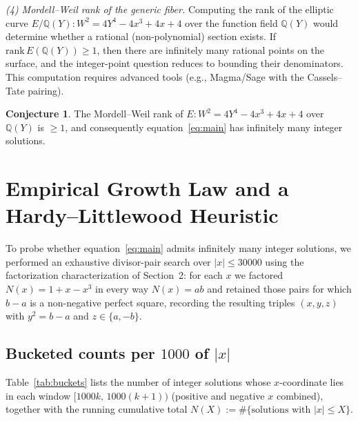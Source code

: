 \documentclass[12pt,a4paper]{article}
\theoremstyle{definition}
\newtheorem{conjecture}[theorem]{Conjecture}
\newcommand{\Q}{\mathbb{Q}}
\begin{document}
\medskip\noindent\emph{(4) Mordell--Weil rank of the generic fiber.}
Computing the rank of the elliptic curve $E/\Q(Y): W^2=4Y^4-4x^3+4x+4$
over the function field $\Q(Y)$ would determine whether a rational
(non-polynomial) section exists.  If $\mathrm{rank}\,E(\Q(Y)) \ge 1$,
then there are infinitely many rational points on the surface, and the
integer-point question reduces to bounding their denominators.
This computation requires advanced tools (e.g., Magma/Sage with the
Cassels--Tate pairing).

\begin{conjecture}
  The Mordell--Weil rank of $E: W^2=4Y^4-4x^3+4x+4$ over $\Q(Y)$ is
  $\ge 1$, and consequently equation~\eqref{eq:main} has infinitely many
  integer solutions.
\end{conjecture}

\section{Empirical Growth Law and a Hardy--Littlewood Heuristic}
\label{sec:growth}

To probe whether equation~\eqref{eq:main} admits infinitely many integer
solutions, we performed an exhaustive divisor-pair search over
$|x|\le 30000$ using the factorization characterization of
Section~2: for each $x$ we factored
$N(x)=1+x-x^3$ in every way $N(x)=ab$ and retained those pairs for which
$b-a$ is a non-negative perfect square, recording the resulting triples
$(x,y,z)$ with $y^2=b-a$ and $z\in\{a,-b\}$.

\subsection{Bucketed counts per $1000$ of $|x|$}

Table~\ref{tab:buckets} lists the number of integer solutions whose
$x$-coordinate lies in each window $[1000k,\,1000(k+1))$
(positive and negative $x$ combined), together with the running cumulative
total $N(X):=\#\{\text{solutions with }|x|\le X\}$.
\end{document}
